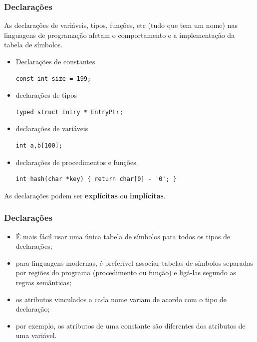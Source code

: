 \documentclass[table]{beamer}
\begin{document}
\begin{frame}[fragile]
   \frametitle{Declarações}
   As declarações de variáveis, tipos, funções, etc (tudo que tem um nome) nas linguagens de programação afetam o comportamento e a implementação da tabela de símbolos.
   \begin{itemize}
      \item Declarações de constantes
      \begin{verbatim} 
const int size = 199; 
      \end{verbatim}
      \item declarações de tipos
      \begin{verbatim} 
typed struct Entry * EntryPtr; 
      \end{verbatim}
      \item declarações de variáveis
\begin{verbatim}
int a,b[100];
\end{verbatim}
      \item declarações de procedimentos e funções.
\begin{verbatim}
int hash(char *key) { return char[0] - '0'; }
\end{verbatim}
   \end{itemize}
   As declarações podem ser \textbf{explícitas} ou \textbf{implícitas}.
\end{frame}

\begin{frame}
   \frametitle{Declarações}
   \begin{itemize}
      \item É mais fácil usar uma única tabela de símbolos para todos os tipos de declarações;
      \item para linguagens modernas, é preferível associar tabelas de símbolos separadas por regiões do programa (procedimento ou função) e ligá-las segundo as regras semânticas;
      \item os atributos vinculados a cada nome variam de acordo com o tipo de declaração;
      \item por exemplo, os atributos de uma constante são diferentes dos atributos de uma variável.
   \end{itemize}
\end{frame}
\end{document}
